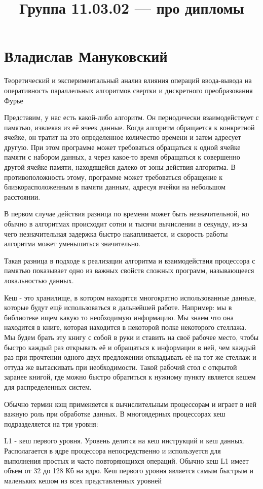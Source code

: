 \documentclass{article}
\title{Группа 11.03.02 --- про дипломы}
\begin{document}
\section*{Владислав Мануковский}
Теоретический и экспериментальный анализ влияния операций ввода-вывода на оперативность параллельных алгоритмов свертки и дискретного преобразования Фурье

Представим, у нас есть какой-либо алгоритм. Он периодически взаимодействует с памятью, извлекая из её ячеек данные.
Когда алгоритм обращается к конкретной ячейке, он тратит на это определенное количество времени и затем адресует другую.
При этом программе может требоваться обращаться к одной ячейке памяти с набором данных, а через какое-то время обращаться к совершенно другой ячейке памяти, находящейся далеко от зоны действия алгоритма.
В противоположность этому, программе может требоваться обращение к близкорасположенным в памяти данным, адресуя ячейки на небольшом расстоянии.

В первом случае действия разница по времени может быть незначительной, но обычно в алгоритмах происходит сотни и тысячи вычислении в секунду, из-за чего незначительная задержка быстро накапливается, и скорость работы алгоритма может уменьшиться значительно.

Такая разница в подходе к реализации алгоритма и взаимодействия процессора с памятью показывает одно из важных свойств сложных программ, называющееся локальностью данных.

Кеш - это хранилище, в котором находятся многократно использованные данные, которые будут ещё использоваться в дальнейшей работе.
Например: мы в библиотеке ищем какую то необходимую информацию. Мы знаем что она находится в книге, которая находится в некоторой полке некоторого стеллажа.
Мы будем брать эту книгу с собой в руки и ставить на своё рабочее место, чтобы быстро каждый раз открывать её и обращаться к информации в ней, чем каждый раз при прочтении одного-двух предложении откладывать её на тот же стеллаж и оттуда же вытаскивать при необходимости.
Такой рабочий стол с открытой заранее книгой, где можно быстро обратиться к нужному пункту является кешем для распределенных систем.

Обычно термин кэщ применяется к вычислительным процессорам и играет в ней важную роль при обработке данных. В многоядерных процессорах кеш подразделяется на три уровня:

L1 - кеш первого уровня.
Уровень делится на кеш инструкций и кеш данных.
Располагается в ядре процессора непосредственно и используется для выполнения простых и часто повторяющихся операций.
Обычно кеш L1 имеет объем от 32 до 128 Кб на ядро.
Кеш первого уровня является самым быстрым и маленьких кешом из всех представленных уровней
\end{document}
